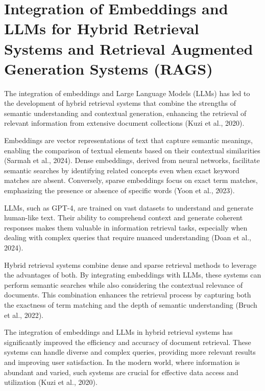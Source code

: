 
\section[RAGS]{Integration of Embeddings and LLMs for Hybrid Retrieval Systems and Retrieval Augmented Generation Systems (RAGS)}

\noindent The integration of embeddings and Large Language Models (LLMs) has led to the development of hybrid retrieval systems that combine the strengths of semantic understanding and contextual generation, enhancing the retrieval of relevant information from extensive document collections (Kuzi et al., 2020).

Embeddings are vector representations of text that capture semantic meanings, enabling the comparison of textual elements based on their contextual similarities (Sarmah et al., 2024). Dense embeddings, derived from neural networks, facilitate semantic searches by identifying related concepts even when exact keyword matches are absent. Conversely, sparse embeddings focus on exact term matches, emphasizing the presence or absence of specific words (Yoon et al., 2023).

LLMs, such as GPT-4, are trained on vast datasets to understand and generate human-like text. Their ability to comprehend context and generate coherent responses makes them valuable in information retrieval tasks, especially when dealing with complex queries that require nuanced understanding (Doan et al., 2024).

Hybrid retrieval systems combine dense and sparse retrieval methods to leverage the advantages of both. By integrating embeddings with LLMs, these systems can perform semantic searches while also considering the contextual relevance of documents. This combination enhances the retrieval process by capturing both the exactness of term matching and the depth of semantic understanding (Bruch et al., 2022).

The integration of embeddings and LLMs in hybrid retrieval systems has significantly improved the efficiency and accuracy of document retrieval. These systems can handle diverse and complex queries, providing more relevant results and improving user satisfaction. In the modern world, where information is abundant and varied, such systems are crucial for effective data access and utilization (Kuzi et al., 2020).



